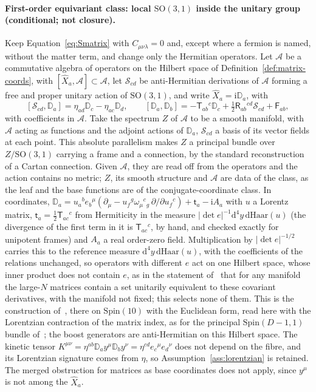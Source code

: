 \paragraph{First-order equivariant class: local \(\mathrm{SO}(3,1)\) inside the unitary group (conditional; not closure).}
Keep Equation~\eqref{eq:Smatrix} with \(C_{\mu\nu\lambda}=0\) and, except where a fermion is named, without the matter term, and change only the Hermitian operators. Let \(\mathcal A\) be a commutative algebra of operators on the Hilbert space of Definition~\ref{def:matrix-coords}, with \([\hat X_a,\mathcal A]\subset\mathcal A\), let \(\mathcal S_{cd}\) be anti-Hermitian derivations of \(\mathcal A\) forming a free and proper unitary action of \(\mathrm{SO}(3,1)\), and write \(\hat X_a=\mathrm i\mathbb D_a\), with
\[
[\mathcal S_{cd},\mathbb D_a]=\eta_{ad}\mathbb D_c-\eta_{ac}\mathbb D_d,\qquad
[\mathbb D_a,\mathbb D_b]=-\mathsf T_{ab}{}^c\mathbb D_c+\tfrac12\mathsf R_{ab}{}^{cd}\mathcal S_{cd}+\mathsf F_{ab},
\]
with coefficients in \(\mathcal A\). Take the spectrum \(Z\) of \(\mathcal A\) to be a smooth manifold, with \(\mathcal A\) acting as functions and the adjoint actions of \(\mathbb D_a\), \(\mathcal S_{cd}\) a basis of its vector fields at each point. This absolute parallelism makes \(Z\) a principal bundle over \(Z/\mathrm{SO}(3,1)\) carrying a frame and a connection, by the standard reconstruction of a Cartan connection. Given \(\mathcal A\), they are read off from the operators and the action contains no metric; \(Z\), its smooth structure and \(\mathcal A\) are data of the class, as the leaf and the base functions are of the conjugate-coordinate class. In coordinates, \(\mathbb D_a=u_a{}^be_b{}^\mu(\partial_\mu-u_f{}^g\omega_\mu{}^c{}_g\,\partial/\partial u_f{}^c)+\mathsf t_a-\mathrm iA_a\) with \(u\) a Lorentz matrix, \(\mathsf t_a=\tfrac12\mathsf T_{ac}{}^c\) from Hermiticity in the measure \(|\det e|^{-1}\mathrm d^4y\,\mathrm d\mathrm{Haar}(u)\) (the divergence of the first term in it is \(\mathsf T_{ac}{}^c\), by hand, and checked exactly for unipotent frames) and \(A_a\) a real order-zero field. Multiplication by \(|\det e|^{-1/2}\) carries this to the reference measure \(\mathrm d^4y\,\mathrm d\mathrm{Haar}(u)\), with the coefficients of the relations unchanged, so operators with different \(e\) act on one Hilbert space, whose inner product does not contain \(e\), as in the statement of~\cite{HanadaKawaiKimura2006b} that for any manifold the large-\(N\) matrices contain a set unitarily equivalent to these covariant derivatives, with the manifold not fixed; this selects none of them. This is the construction of~\cite{HanadaKawaiKimura2006}, there on \(\mathrm{Spin}(10)\) with the Euclidean form, read here with the Lorentzian contraction of the matrix index, as for the principal \(\mathrm{Spin}(D-1,1)\) bundle of~\cite{AsanoKawaiTsuchiya2012}; the boost generators are anti-Hermitian on this Hilbert space. The kinetic tensor \(K^{\mu\nu}=\eta^{ab}\mathbb D_ay^\mu\mathbb D_by^\nu=\eta^{cd}e_c{}^\mu e_d{}^\nu\) does not depend on the fibre, and its Lorentzian signature comes from \(\eta\), so Assumption~\ref{ass:lorentzian} is retained. The merged obstruction for matrices as base coordinates does not apply, since \(y^\mu\) is not among the \(\hat X_a\).

